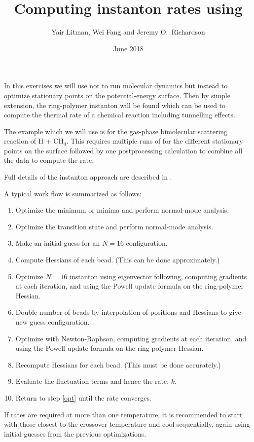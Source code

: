 \documentclass{article}
\title{Computing instanton rates using \ipi{}}
\author{Yair Litman, Wei Fang and Jeremy O.\ Richardson}
\date{June 2018}
\begin{document}
\maketitle

In this exercises we will use \ipi{} not to run molecular dynamics
but instead to optimize stationary points on the potential-energy surface.
Then by simple extension, the ring-polymer instanton will be found
which can be used to compute the thermal rate of a chemical reaction including tunnelling effects.

The example which we will use is for the gas-phase bimolecular scattering reaction of H + CH$_4$.
This requires multiple runs of \ipi{} for the different stationary points on the surface
followed by one postprocessing calculation to combine all the data to compute the rate.

Full details of the instanton approach are described in \cite{InstReview}.

A typical work flow is summarized as follows:
\begin{enumerate}
	\item Optimize the minimum or minima and perform normal-mode analysis.
	\item Optimize the transition state and perform normal-mode analysis.
	\item Make an initial guess for an $N=16$ configuration.
	\item Compute Hessians of each bead. (This can be done approximately.)
	\item Optimize $N=16$ instanton using eigenvector following, computing gradients at each iteration, and using the Powell update formula on the ring-polymer Hessian.
	\item Double number of beads by interpolation of positions and Hessians to give new guess configuration.
	\item Optimize with Newton-Raphson, computing gradients at each iteration, and using the Powell update formula on the ring-polymer Hessian.
		\label{opt}
	\item Recompute Hessians for each bead.  (This must be done accurately.)
	\item Evaluate the fluctuation terms and hence the rate, $k$.
	\item Return to step \ref{opt} until the rate converges.
\end{enumerate}

If rates are required at more than one temperature,
it is recommended to start with those closest to the crossover temperature and cool sequentially,
again using initial guesses from the previous optimizations.
\end{document}
